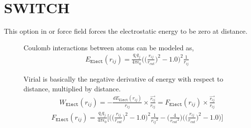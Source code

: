 \documentclass[letterpaper,10pt,english]{sphinxmanual}
\begin{document}
\section{SWITCH}
\label{\detokenize{electrostatic:switch}}
\sphinxAtStartPar
This option in  or  force field forces the electrostatic energy to be zero at  distance.
\begin{description}
\item[{}] \leavevmode
\sphinxAtStartPar
Coulomb interactions between atoms can be modeled as,
\begin{equation*}
\begin{split}E_{\texttt{Elect}}(r_{ij}) = \frac{q_i q_j}{4\pi \epsilon_0} \bigg( \Big(\frac{r_{ij}}{r_{cut}} \Big)^2 - 1.0\bigg)^2 \frac{1}{r_{ij}}\end{split}
\end{equation*}
\item[{}] \leavevmode
\sphinxAtStartPar
Virial is basically the negative derivative of energy with respect to distance, multiplied by distance.
\begin{equation*}
\begin{split}W_{\texttt{Elect}}(r_{ij}) = -\frac{dE_{\texttt{Elect}}(r_{ij})}{r_{ij}}\times \frac{\overrightarrow{r_{ij}}}{{r_{ij}}} = F_{\texttt{Elect}}(r_{ij}) \times \frac{\overrightarrow{r_{ij}}}{{r_{ij}}}\end{split}
\end{equation*}\begin{equation*}
\begin{split}F_{\texttt{Elect}}(r_{ij}) = \frac{q_i q_j}{4\pi \epsilon_0} \Bigg[ \bigg( \Big(\frac{r_{ij}}{r_{cut}} \Big)^2 - 1.0\bigg)^2 \frac{1}{{r_{ij}}^2} - \bigg( \frac{4}{{r_{cut}}^2} \bigg) \bigg( \Big(\frac{r_{ij}}{r_{cut}} \Big)^2 - 1.0\bigg) \Bigg]\end{split}
\end{equation*}
\end{description}
\end{document}
